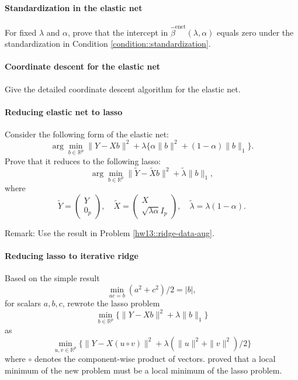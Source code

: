 \paragraph{Standardization in the elastic net}\label{hw14::standardization-enet}


For fixed $\lambda$ and $\alpha$, prove that the intercept in 
$
\hat{\beta}^{\text{enet}}(\lambda,\alpha)
$
equals zero under the standardization in Condition \ref{condition::standardization}. 


\paragraph{Coordinate descent for the elastic net}\label{hw14::enet-coordinate-descent}

Give the detailed coordinate descent algorithm for the elastic net. 


\paragraph{Reducing elastic net to lasso}\label{hw14::enet-lasso}


Consider the following form of the elastic net:
$$
\arg\min_{ b \in\mathbb{R}^{p}}  \|  Y -Xb \|^2 + \lambda  \{  \alpha \| b\|^2 + (1-\alpha) \| b \|_1 \} .
$$
Prove that it reduces to the following lasso:
$$
\arg\min_{b\in\mathbb{R}^{p}}  \|  \tilde Y -  \tilde Xb \|^2 + \tilde  \lambda  \| b \|_1,
$$
where 
$$
\tilde Y = \begin{pmatrix}
Y \\
0_p
\end{pmatrix},\quad
\tilde X = \begin{pmatrix}
X \\
\sqrt{\lambda \alpha} I_p
\end{pmatrix},\quad
\tilde{\lambda} = \lambda  (1-\alpha).
$$

Remark: Use the result in Problem \ref{hw13::ridge-data-aug}.




\paragraph{Reducing lasso to iterative ridge}\label{hw14::lasso-iterative-ridge} 



Based on the simple result 
$$
\min_{ac=b} (a^2+c^2)/2 = |b|,
$$
for scalars $a,b,c$, \citet{hoff2017lasso} rewrote the lasso problem 
$$
\min_{b\in  \mathbb{R}^p } \{   \| Y-Xb\|^2 + \lambda \|b\|_1 \}
$$
as
$$
\min_{u,v\in  \mathbb{R}^p } \{   \| Y-X(u\circ v)\|^2 + \lambda ( \|u\|^2 + \|v\|^2 )/2 \}
$$
where $\circ$ denotes the component-wise product of vectors. \citet[][Lemma 1]{hoff2017lasso} proved that a local minimum of the new problem must be a local minimum of the lasso problem. 

